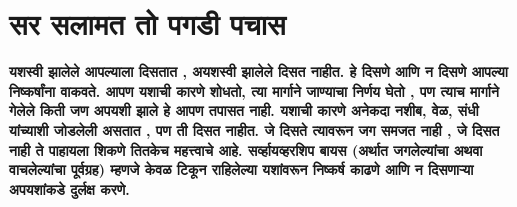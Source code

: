 \chapter{सर सलामत तो पगडी पचास}

\textcolor{blue!60!black}{\textbf{यशस्वी झालेले आपल्याला दिसतात , अयशस्वी झालेले दिसत नाहीत. हे दिसणे आणि न दिसणे आपल्या निष्कर्षांना वाकवते. आपण यशाची कारणे शोधतो, त्या मार्गाने जाण्याचा निर्णय घेतो , पण त्याच मार्गाने गेलेले किती जण अपयशी झाले हे आपण तपासत नाही. यशाची कारणे अनेकदा नशीब, वेळ, संधी यांच्याशी जोडलेली असतात , पण ती दिसत नाहीत. जे दिसते त्यावरून जग समजत नाही , जे दिसत नाही ते पाहायला शिकणे तितकेच महत्त्वाचे आहे. सर्व्हायव्हरशिप बायस (अर्थात जगलेल्यांचा अथवा वाचलेल्यांचा पूर्वग्रह) म्हणजे केवळ टिकून राहिलेल्या यशांवरून निष्कर्ष काढणे आणि न दिसणाऱ्या अपयशांकडे दुर्लक्ष करणे.}}

